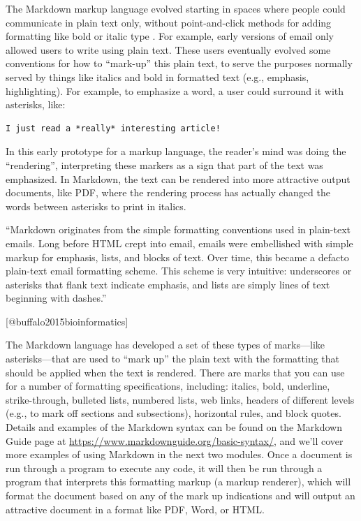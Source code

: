 \documentclass[]{tufte-book}
\begin{document}
The Markdown markup language evolved starting in spaces where people could
communicate in plain text only, without point-and-click methods for adding
formatting like bold or italic type \citep{buffalo2015bioinformatics}. For example,
early versions of email only allowed users to write using plain text. These
users eventually evolved some conventions for how to ``mark-up'' this plain text,
to serve the purposes normally served by things like italics and bold in formatted text
(e.g., emphasis, highlighting). For example, to emphasize a word, a user could
surround it with asterisks, like:

\begin{verbatim}
I just read a *really* interesting article!
\end{verbatim}

In this early prototype for a markup language, the reader's mind was doing
the ``rendering'', interpreting these markers as a sign that part of the text
was emphasized. In Markdown, the text can be rendered into more attractive
output documents, like PDF, where the rendering process has actually
changed the words between asterisks to print in italics.

\begin{marginfigure}
``Markdown originates from the simple formatting conventions used in
plain-text emails. Long before HTML crept into email, emails were
embellished with simple markup for emphasis, lists, and blocks of text.
Over time, this became a defacto plain-text email formatting scheme.
This scheme is very intuitive: underscores or asterisks that flank text
indicate emphasis, and lists are simply lines of text beginning with
dashes.''

{[}@buffalo2015bioinformatics{]}
\end{marginfigure}

The Markdown language has developed a set of these types of marks---like
asterisks---that are used to ``mark up'' the plain text with the formatting that
should be applied when the text is rendered. There are marks that you can use
for a number of formatting specifications, including: italics, bold, underline,
strike-through, bulleted lists, numbered lists, web links, headers of different
levels (e.g., to mark off sections and subsections), horizontal
rules, and block quotes. Details and examples of the Markdown syntax can be
found on the Markdown Guide page at \url{https://www.markdownguide.org/basic-syntax/},
and we'll cover more examples of using Markdown in the next two modules. Once a
document is run through a program to execute any code, it will then be run
through a program that interprets this formatting markup (a markup renderer),
which will format the document based on any of the mark up indications and will
output an attractive document in a format like PDF, Word, or HTML.
\end{document}

